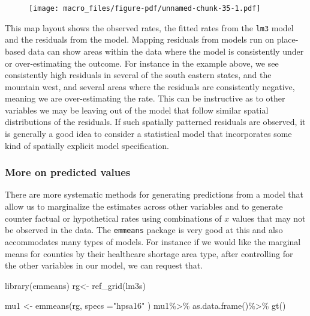 \documentclass[
  letterpaper,
  DIV=11,
  numbers=noendperiod]{scrreprt}
\newenvironment{Shaded}{\begin{snugshade}}{\end{snugshade}}
\newcommand{\AttributeTok}[1]{\textcolor[rgb]{0.40,0.45,0.13}{#1}}
\newcommand{\FunctionTok}[1]{\textcolor[rgb]{0.28,0.35,0.67}{#1}}
\newcommand{\NormalTok}[1]{\textcolor[rgb]{0.00,0.23,0.31}{#1}}
\newcommand{\OtherTok}[1]{\textcolor[rgb]{0.00,0.23,0.31}{#1}}
\newcommand{\SpecialCharTok}[1]{\textcolor[rgb]{0.37,0.37,0.37}{#1}}
\newcommand{\StringTok}[1]{\textcolor[rgb]{0.13,0.47,0.30}{#1}}
\begin{document}
\begin{figure}[H]

{\centering \texttt{[image: macro\_files/figure-pdf/unnamed-chunk-35-1.pdf]}

}

\end{figure}

This map layout shows the observed rates, the fitted rates from the
\texttt{lm3} model and the residuals from the model. Mapping residuals
from models run on place-based data can show areas within the data where
the model is consistently under or over-estimating the outcome. For
instance in the example above, we see consistently high residuals in
several of the south eastern states, and the mountain west, and several
areas where the residuals are consistently negative, meaning we are
over-estimating the rate. This can be instructive as to other variables
we may be leaving out of the model that follow similar spatial
distributions of the residuals. If such spatially patterned residuals
are observed, it is generally a good idea to consider a statistical
model that incorporates some kind of spatially explicit model
specification.

\hypertarget{more-on-predicted-values}{%
\subsubsection{More on predicted
values}\label{more-on-predicted-values}}

There are more systematic methods for generating predictions from a
model that allow us to marginalize the estimates across other variables
and to generate counter factual or hypothetical rates using combinations
of \(x\) values that may not be observed in the data. The
\texttt{emmeans} package is very good at this and also accommodates many
types of models. For instance if we would like the marginal means for
counties by their healthcare shortage area type, after controlling for
the other variables in our model, we can request that.

\begin{Shaded}
\begin{Highlighting}[]
\FunctionTok{library}\NormalTok{(emmeans)}
\NormalTok{rg}\OtherTok{\textless{}{-}} \FunctionTok{ref\_grid}\NormalTok{(lm3s)}

\NormalTok{mu1 }\OtherTok{\textless{}{-}} \FunctionTok{emmeans}\NormalTok{(rg, }\AttributeTok{specs =}\StringTok{"hpsa16"}\NormalTok{ )}
\NormalTok{mu1}\SpecialCharTok{\%\textgreater{}\%}
  \FunctionTok{as.data.frame}\NormalTok{()}\SpecialCharTok{\%\textgreater{}\%}
  \FunctionTok{gt}\NormalTok{()}
\end{Highlighting}
\end{Shaded}
\end{document}
